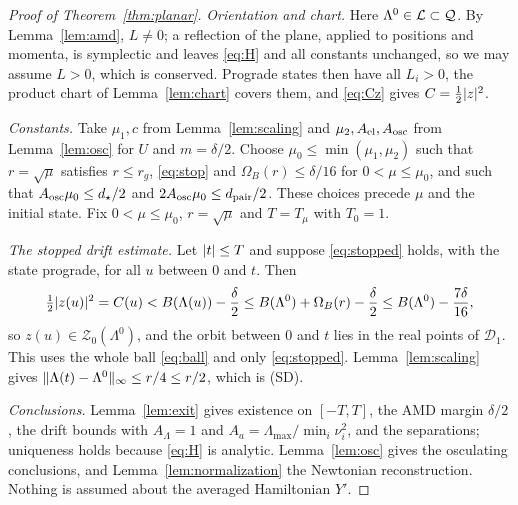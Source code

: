 \begin{proof}[Proof of Theorem~\ref{thm:planar}]
\emph{Orientation and chart.} Here $\Lambda^0\in\mathcal{L}\subset\mathcal{Q}$. By Lemma~\ref{lem:amd}, $L\ne0$; a reflection of the plane, applied to positions and momenta, is symplectic and leaves \eqref{eq:H} and all constants unchanged, so we may assume $L>0$, which is conserved. Prograde states then have all $L_i>0$, the product chart of Lemma~\ref{lem:chart} covers them, and \eqref{eq:Cz} gives $C=\tfrac12\lvert z\rvert^2$.

\emph{Constants.} Take $\mu_1,c$ from Lemma~\ref{lem:scaling} and $\mu_2,A_{\mathrm{el}},A_{\mathrm{osc}}$ from Lemma~\ref{lem:osc} for $U$ and $m=\delta/2$. Choose $\mu_0\le\min(\mu_1,\mu_2)$ such that $r=\sqrt\mu$ satisfies $r\le r_g$, \eqref{eq:stop} and $\Omega_B(r)\le\delta/16$ for $0<\mu\le\mu_0$, and such that $A_{\mathrm{osc}}\mu_0\le d_\star/2$ and $2A_{\mathrm{osc}}\mu_0\le d_{\mathrm{pair}}/2$. These choices precede $\mu$ and the initial state. Fix $0<\mu\le\mu_0$, $r=\sqrt\mu$ and $T=T_\mu$ with $T_0=1$.

\emph{The stopped drift estimate.} Let $\lvert t\rvert\le T$ and suppose \eqref{eq:stopped} holds, with the state prograde, for all $u$ between $0$ and $t$. Then
\[
\tfrac12\lvert z(u)\rvert^2=C(u)<B(\Lambda(u))-\frac\delta2\le B(\Lambda^0)+\Omega_B(r)-\frac\delta2\le B(\Lambda^0)-\frac{7\delta}{16},
\]
so $z(u)\in\mathcal Z_0(\Lambda^0)$, and the orbit between $0$ and $t$ lies in the real points of $\mathcal D_1$. This uses the whole ball \eqref{eq:ball} and only \eqref{eq:stopped}. Lemma~\ref{lem:scaling} gives $\lVert \Lambda(t)-\Lambda^0\rVert_\infty\le r/4\le r/2$, which is (SD).

\emph{Conclusions.} Lemma~\ref{lem:exit} gives existence on $[-T,T]$, the AMD margin $\delta/2$, the drift bounds with $A_\Lambda=1$ and $A_a=\Lambda_{\max}/\min_i\nu_i^2$, and the separations; uniqueness holds because \eqref{eq:H} is analytic. Lemma~\ref{lem:osc} gives the osculating conclusions, and Lemma~\ref{lem:normalization} the Newtonian reconstruction. Nothing is assumed about the averaged Hamiltonian $Y'$.
\end{proof}
